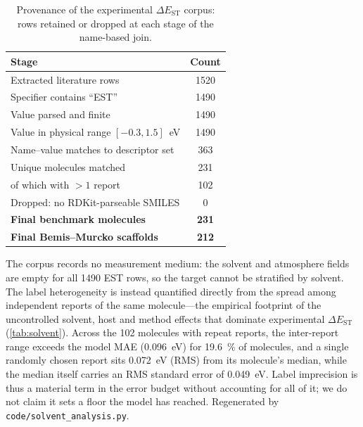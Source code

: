 \documentclass[twoside,twocolumn,9pt]{extarticle}
\begin{document}
\begin{table}[htbp]
  \centering
  \caption{Provenance of the experimental $\Delta E_\text{ST}$ corpus: rows
    retained or dropped at each stage of the name-based join.}
  \label{tab:provenance}
  \footnotesize
  \begin{tabular}{lc}
    \toprule
    Stage & Count \\
    \midrule
    Extracted literature rows                 & 1520 \\
    Specifier contains ``EST''                & 1490 \\
    Value parsed and finite                   & 1490 \\
    Value in physical range $[-0.3,1.5]$~eV   & 1490 \\
    Name--value matches to descriptor set     & 363 \\
    Unique molecules matched                  & 231 \\
    \quad of which with $>1$ report           & 102 \\
    Dropped: no RDKit-parseable SMILES        & 0 \\
    \midrule
    \textbf{Final benchmark molecules}        & \textbf{231} \\
    \textbf{Final Bemis--Murcko scaffolds}    & \textbf{212} \\
    \bottomrule
  \end{tabular}
\end{table}

The corpus records no measurement medium: the solvent and atmosphere fields are
empty for all \num{1490} EST rows, so the target cannot be stratified by solvent.
The label heterogeneity is instead quantified directly from the spread among
independent reports of the same molecule---the empirical footprint of the
uncontrolled solvent, host and method effects that dominate experimental
$\Delta E_\text{ST}$~\cite{Olivier2017} (\cref{tab:solvent}). Across the \num{102}
molecules with repeat reports, the inter-report range exceeds the model MAE
(\qty{0.096}{\electronvolt}) for \qty{19.6}{\percent} of molecules, and a single
randomly chosen report sits \qty{0.072}{\electronvolt} (RMS) from its molecule's
median, while the median itself carries an RMS standard error of
\qty{0.049}{\electronvolt}. Label imprecision is thus a material term in the error
budget without accounting for all of it; we do not claim it sets a floor the model has
reached. Regenerated by
\texttt{code/solvent\_analysis.py}.
\end{document}
